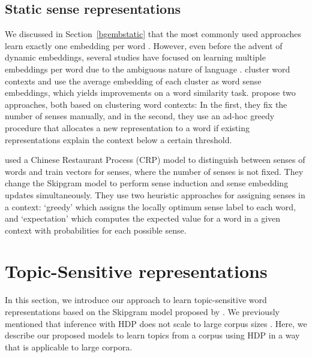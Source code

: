 \subsection{Static sense representations} 

We discussed in Section~\ref{bgembstatic} that the most commonly used approaches learn exactly one embedding per word \citep{mikolov2013efficient,pennington2014glove}.
However, even before the advent of dynamic embeddings, several studies have focused on learning multiple embeddings per word due to the ambiguous nature of language \citep{qiu-tu-yu:2016:EMNLP2016}.
\citet{huang2012improving} cluster word contexts and use the average embedding of each cluster as word sense embeddings, which yields improvements on a word similarity task. 
\citet{neelakantan2014efficient} propose two approaches, both based on clustering word contexts: In the first, they fix the number of senses manually, and in the second, they use an ad-hoc greedy procedure that allocates a new representation to a word if existing representations explain the context below a certain threshold.

\citet{li-jurafsky:2015:EMNLP} used a Chinese Restaurant Process (CRP) model to distinguish between senses of words and train vectors for senses, where the number of senses is not fixed. 
They change the Skipgram model \citep{mikolov2013efficient} to perform sense induction and sense embedding updates simultaneously. 
They use two heuristic approaches for assigning senses in a context: `greedy' which assigns the locally optimum sense label to each word, and `expectation' which computes the expected value for a word in a given context with probabilities for each possible sense. 

\section{Topic-Sensitive representations} \label{sect:model}

In this section, we introduce our approach to learn topic-sensitive word representations based on the Skipgram model proposed by \citet{mikolov2013efficient}.
We previously mentioned that inference with HDP does not scale to large corpus sizes \citep{Jordan2011THEEO,6802355}.
Here, we describe our proposed models to learn topics from a corpus using HDP \citep{teh2006hierarchical,lau2014learning} in a way that is applicable to large corpora.

